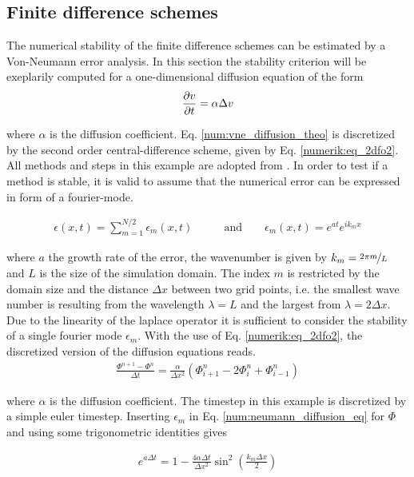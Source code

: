\subsection{Finite difference schemes}

The numerical stability of the finite difference schemes can be estimated by a Von-Neumann error analysis.
In this section the stability criterion will be exeplarily computed for a one-dimensional diffusion equation of the form
\begin{align}
    \label{num:vne_diffusion_theo}
    \pdn[v]{t} = \alpha \Delta v
\end{align}

where $\alpha$ is the diffusion coefficient. Eq.  \ref{num:vne_diffusion_theo} is discretized by
the second order central-difference scheme, given by Eq. \ref{numerik:eq_2dfo2}.
All methods and steps in this example are adopted from \citep{janderson}.
In order to test if a method is stable, it is valid to assume that the numerical error can be expressed in form of a fourier-mode.

\begin{align}
    \epsilon(x, t) = \sum_{m=1}^{N/2} \epsilon_m(x, t) \qquad &\text{and} \qquad  \epsilon_m(x, t) = e^{at}e^{i k_m x}
\end{align}

where $a$ the growth rate of the error, the wavenumber is given by $k_m=\nicefrac{2\pi m}{L}$ and $L$ is the size of the simulation domain.
The index $m$ is restricted by the domain size and the distance $\Delta x$ between two grid points, i.e. the smallest wave number
is resulting from the wavelength $\lambda=L$ and the largest from $\lambda=2\Delta x$.
Due to the linearity of the laplace operator it is sufficient to consider the stability of a single fourier mode $\epsilon_m$.
With the use of Eq.  \ref{numerik:eq_2dfo2}, the discretized version of the diffusion equations reads.
\begin{align}
    \label{num:neumann_diffusion_eq}
    \frac{\Phi^{n+1} - \Phi^n}{\Delta t} = \frac{\alpha}{\Delta x^2}\left(\Phi_{i+1}^n - 2\Phi_{i}^n + \Phi_{i-1}^n\right)
\end{align}

where $\alpha$ is the diffusion coefficient. The timestep in this example is discretized by a simple euler timestep.
Inserting $\epsilon_m$ in Eq. \ref{num:neumann_diffusion_eq} for $\Phi$ and using some trigonometric identities  gives

\begin{align}
    e^{a \Delta t} = 1 -  \frac{4\alpha \Delta t}{\Delta x^2} \sin^2\left(\frac{k_m \Delta x}{2}\right)
\end{align}

